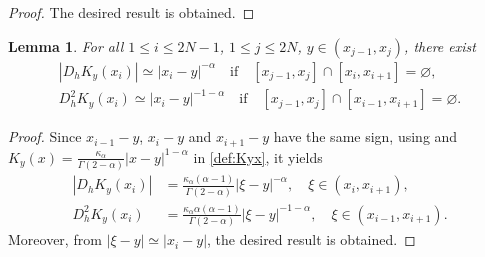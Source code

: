 \documentclass{amsart}
\newtheorem{lemma}[theorem]{Lemma}
\theoremstyle{definition}
\theoremstyle{remark}
\numberwithin{equation}{section}
\begin{document}
\begin{proof}
  The desired result is obtained.
\end{proof}

\begin{lemma} \label{lmm:Dh2Kyxi}
  For all \(1 \le i \le 2N-1\), \(1\le j \le 2N\), $y\in (x_{j-1}, x_{j})$, there exist
  \begin{gather*}
    |D_h K_y (x_i)| \simeq | x_i - y|^{-\alpha} \quad\text{if}\quad [x_{j-1}, x_{j}] \cap [x_i, x_{i+1}] = \varnothing , \\
    D_h^2 K_y (x_i) \simeq | x_i - y |^{-1-\alpha} \quad\text{if}\quad [x_{j-1}, x_{j}] \cap [x_{i-1}, x_{i+1}] = \varnothing.
  \end{gather*}
\end{lemma}
\begin{proof}
  Since \(x_{i-1}-y\), \(x_{i}-y\) and \(x_{i+1}-y\) have the same sign, using  and $K_y(x) = \frac{\kappa_\alpha}{\Gamma(2-\alpha)}|x-y|^{1-\alpha}$ in \eqref{def:Kyx}, it yields
  \begin{equation*}
    \begin{aligned}
      |D_h K_y (x_i)| &= \frac{\kappa_\alpha(\alpha-1)}{\Gamma(2-\alpha)}|\xi-y|^{-\alpha}, \quad \xi\in (x_{i}, x_{i+1})  ,\\
      D_h^2 K_y (x_i) & = \frac{\kappa_\alpha \alpha(\alpha-1)}{\Gamma(2-\alpha)}|\xi-y|^{-1-\alpha}, \quad \xi\in (x_{i-1}, x_{i+1})  .
    \end{aligned}
  \end{equation*}
  Moreover, from \(|\xi-y| \simeq |x_i-y|\), the desired result is obtained.
\end{proof}
\end{document}
